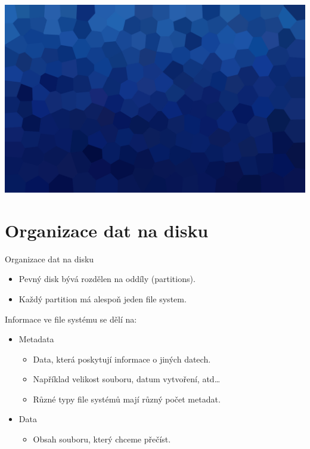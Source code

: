 \documentclass[aspectratio=169,xcolor=dvipsnames, t]{beamer}
\begin{document}
{
{
    \includegraphics[width=\paperwidth,height=\paperheight]{AICStyleData/logos/mene_polygonu_bg.png}
}
\section{Organizace dat na disku}
\begin{frame}{Organizace dat na disku}
\begin{itemize}
    \item Pevný disk bývá rozdělen na oddíly (partitions).
    \item Každý partition má alespoň jeden file system.
\end{itemize}
Informace ve file systému se dělí na:
\begin{itemize}
    \item Metadata
    \begin{itemize}
        \item Data, která poskytují informace o jiných datech.
        \item Například velikost souboru, datum vytvoření, atd\dots
        \item Různé typy file systémů mají různý počet metadat.
    \end{itemize}
    \item Data
    \begin{itemize}
        \item Obsah souboru, který chceme přečíst.
    \end{itemize}
\end{itemize}

\end{frame}
}
\end{document}
